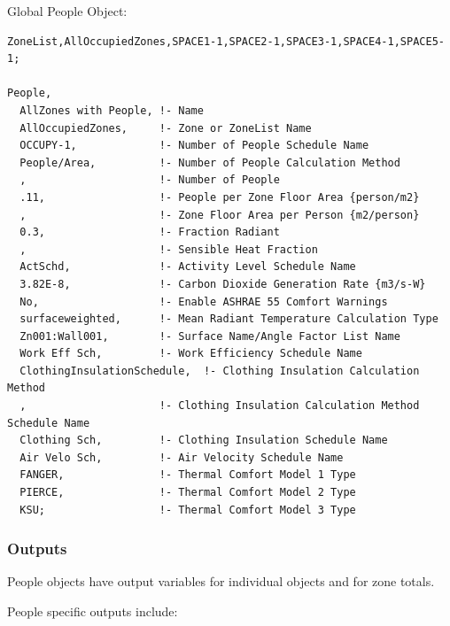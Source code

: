 Global People Object:

\begin{lstlisting}
ZoneList,AllOccupiedZones,SPACE1-1,SPACE2-1,SPACE3-1,SPACE4-1,SPACE5-1;

People,
  AllZones with People, !- Name
  AllOccupiedZones,     !- Zone or ZoneList Name
  OCCUPY-1,             !- Number of People Schedule Name
  People/Area,          !- Number of People Calculation Method
  ,                     !- Number of People
  .11,                  !- People per Zone Floor Area {person/m2}
  ,                     !- Zone Floor Area per Person {m2/person}
  0.3,                  !- Fraction Radiant
  ,                     !- Sensible Heat Fraction
  ActSchd,              !- Activity Level Schedule Name
  3.82E-8,              !- Carbon Dioxide Generation Rate {m3/s-W}
  No,                   !- Enable ASHRAE 55 Comfort Warnings
  surfaceweighted,      !- Mean Radiant Temperature Calculation Type
  Zn001:Wall001,        !- Surface Name/Angle Factor List Name
  Work Eff Sch,         !- Work Efficiency Schedule Name
  ClothingInsulationSchedule,  !- Clothing Insulation Calculation Method
  ,                     !- Clothing Insulation Calculation Method Schedule Name
  Clothing Sch,         !- Clothing Insulation Schedule Name
  Air Velo Sch,         !- Air Velocity Schedule Name
  FANGER,               !- Thermal Comfort Model 1 Type
  PIERCE,               !- Thermal Comfort Model 2 Type
  KSU;                  !- Thermal Comfort Model 3 Type
\end{lstlisting}

\subsubsection{Outputs}\label{outputs-017}

People objects have output variables for individual objects and for zone totals.

People specific outputs include:

